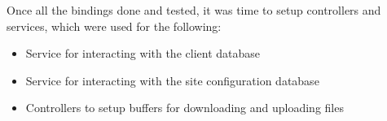 Once all the bindings done and tested, it was time to setup controllers and services,
which were used for the following:

    \begin{itemize}
        \item Service for interacting with the client database
        \item Service for interacting with the site configuration database
        \item Controllers to setup buffers for downloading and uploading files
    \end{itemize}
